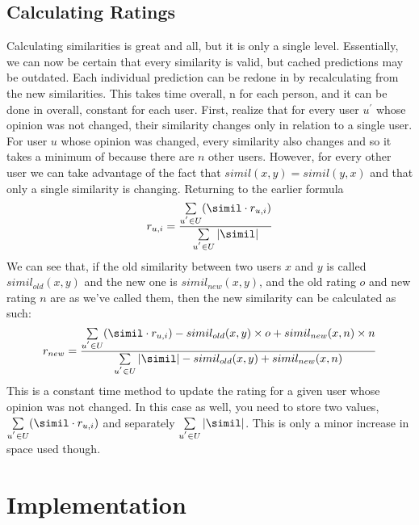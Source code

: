 \documentclass[12pt]{article}
\begin{document}
  \subsection{Calculating Ratings}
  \indent\indent Calculating similarities is great and all, but it is only a single level.  Essentially, we can now be certain that every similarity is valid, but cached predictions may be outdated.  Each individual prediction can be redone in  by recalculating from the new similarities.  This takes  time overall, n for each person, and it can be done in  overall, constant for each user.
  \p First, realize that for every user $u^{'}$ whose opinion was not changed, their similarity changes only in relation to a single user.  For user $u$ whose opinion was changed, every similarity also changes and so it takes a minimum of  because there are $n$ other users.  However, for every other user we can take advantage of the fact that $simil(x, y) = simil(y, x)$ and that only a single similarity is changing.  
  \p Returning to the earlier formula
  \begin{displaymath}
    r_{u, i} = \frac{\sum \limits_{u^{'} \in U} (\simil \cdot r_{u, i})}{\sum \limits_{u^{'} \in U} |\simil|}
  \end{displaymath}
  \p We can see that, if the old similarity between two users $x$ and $y$ is called $simil_{old}(x, y)$ and the new one is $simil_{new}(x, y)$, and the old rating $o$ and new rating $n$ are as we've called them, then the new similarity can be calculated as such:
  \begin{displaymath}
    r_{new} = \frac{\sum \limits_{u^{'} \in U} (\simil \cdot r_{u, i}) - simil_{old}(x, y) \times o + simil_{new}(x, n) \times n}{\sum \limits_{u^{'} \in U} |\simil| - simil_{old}(x, y) + simil_{new}(x, n)}
  \end{displaymath}
  \p This is a constant time method to update the rating for a given user whose opinion was not changed.  In this case as well, you need to store two values, $\sum \limits_{u^{'} \in U} (\simil \cdot r_{u, i})$ and separately $\sum \limits_{u^{'} \in U} |\simil|$.  This is only a minor increase in space used though.  

  \pagebreak
  \section{Implementation}

 
\end{document}
